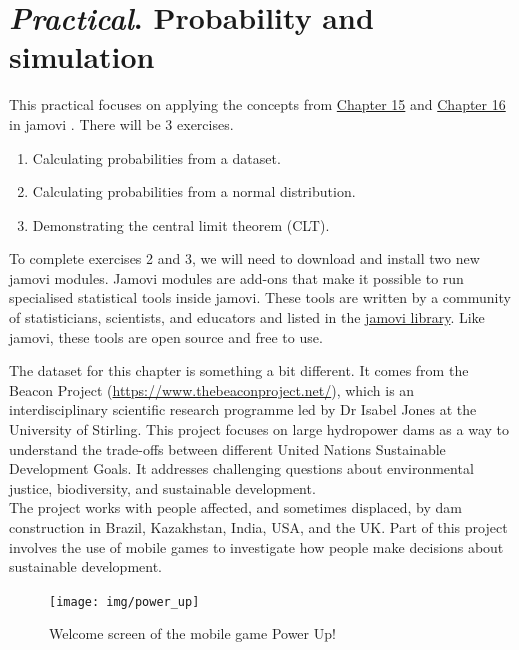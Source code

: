 \documentclass[
]{scrbook}
\providecommand{\tightlist}{%
  \setlength{\itemsep}{0pt}\setlength{\parskip}{0pt}}
\begin{document}
\hypertarget{Chapter_17}{%
\chapter{\texorpdfstring{\emph{Practical}. Probability and simulation}{Practical. Probability and simulation}}\label{Chapter_17}}

This practical focuses on applying the concepts from \protect\hyperlink{Chapter_15}{Chapter 15} and \protect\hyperlink{Chapter_16}{Chapter 16} in jamovi \citep{Jamovi2022}.
There will be 3 exercises.

\begin{enumerate}
\def\labelenumi{\arabic{enumi}.}
\tightlist
\item
  Calculating probabilities from a dataset.
\item
  Calculating probabilities from a normal distribution.
\item
  Demonstrating the central limit theorem (CLT).
\end{enumerate}

To complete exercises 2 and 3, we will need to download and install two new jamovi modules.
Jamovi modules are add-ons that make it possible to run specialised statistical tools inside jamovi.
These tools are written by a community of statisticians, scientists, and educators and listed in the \href{https://www.jamovi.org/library.html}{jamovi library}.
Like jamovi, these tools are open source and free to use.

The dataset for this chapter is something a bit different.
It comes from the Beacon Project (\url{https://www.thebeaconproject.net/}), which is an interdisciplinary scientific research programme led by Dr Isabel Jones at the University of Stirling.
This project focuses on large hydropower dams as a way to understand the trade-offs between different United Nations Sustainable Development Goals.
It addresses challenging questions about environmental justice, biodiversity, and sustainable development.\\
The project works with people affected, and sometimes displaced, by dam construction in Brazil, Kazakhstan, India, USA, and the UK.
Part of this project involves the use of mobile games to investigate how people make decisions about sustainable development.

\begin{figure}
\texttt{[image: img/power\_up]} \caption{Welcome screen of the mobile game Power Up!}\label{fig:unnamed-chunk-71}
\end{figure}
\end{document}
